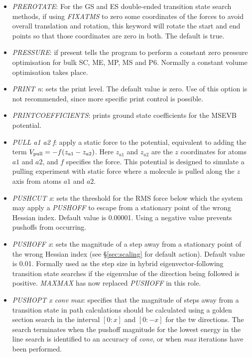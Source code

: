 \documentclass[12pt,a4paper,dvips]{article}
\begin{document}
\begin{itemize}
\item {\it PREROTATE\/}: For the GS and ES double-ended transition state
  search methods, if using {\it FIXATMS\/} to zero some coordinates of the
  forces to avoid overall translation and rotation, this keyword will rotate
  the start and end points so that those coordinates are zero in both.
The default is true.

\item {\it PRESSURE\/}: if present 
tells the program to perform a constant zero pressure optimisation
for bulk SC, ME, MP, MS and P6. Normally a constant volume optimisation takes place. 

\item {\it PRINT n\/}: sets the print level. The default value is zero. Use
of this option is not recommended, since more specific print control is possible.

\item {\it PRINTCOEFFICIENTS\/}: prints ground state coefficients for the MSEVB potential.

\item {\it PULL a1 a2 f\/}: apply a static force to the potential, equivalent to adding
the term $V_{\rm pull}=-f(z_{a1}-z_{a2})$. Here $z_{a1}$ and $z_{a2}$ are the $z$
coordinates for atoms $a1$ and $a2$, and $f$ specifies the force.
This potential is designed to simulate a pulling experiment with static force where
a molecule is pulled along the $z$ axis from atoms $a1$ and $a2$.

\item {\it PUSHCUT x\/}: sets the threshold for the RMS force below which the
system may apply a {\it PUSHOFF\/} to escape from a stationary point of the wrong Hessian
index. Default value is 0.00001. Using a negative value prevents pushoffs from
occurring.

\item {\it PUSHOFF x\/}: sets the magnitude of a step away from a stationary
point of the wrong Hessian index (see \S\ref{sec:scaling} for default action). Default value is 0.01.
Formally used as the step size in hybrid eigenvector-following
transition state searches if the eigenvalue of the direction being followed is positive.
{\it MAXMAX} has now replaced {\it PUSHOFF\/} in this role.

\item {\it PUSHOPT x conv max\/}: specifies that the magnitude of steps away from a transition state in 
path calculations should be calculated using a golden section search in the interval $[0:x]$ and
$[0:-x]$ for the tw directions. The search terminates when the pushoff magnitude for the
lowest energy in the line search is identified to an accuracy of {\it conv}, or when
{\it max} iterations have been performed.


\end{itemize}
\end{document}
